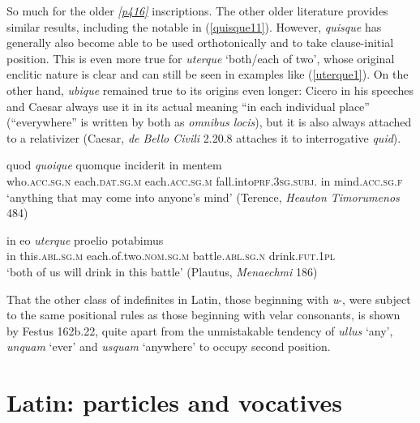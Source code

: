 So much for the older \hyperlink{p416}{\emph{[p416]}} inscriptions. The other older literature provides similar results, including the notable  in (\ref{quisque11}). However, \emph{quisque} has generally also become able to be used orthotonically and to take clause-initial position. This is even more true for \emph{uterque} `both/each of two', whose original enclitic nature is clear and can still be seen in examples like (\ref{uterque1}). On the other hand, \emph{ubique} remained true to its origins even longer: Cicero in his speeches and Caesar always use it in its actual meaning ``in each individual place'' (``everywhere'' is written by both as \emph{omnibus locis}), but it is also always attached to a relativizer (Caesar, \textit{de Bello Civili} 2.20.8 attaches it to interrogative \emph{quid}).

\begin{exe}
\ex
\gll quod \emph{quoique} quomque inciderit in mentem\\
who.\textsc{acc.sg.n} each.\textsc{dat.sg.m} each.\textsc{acc.sg.m} fall.into\textsc{prf.3sg.subj.} in mind.\textsc{acc.sg.f}\\
\trans `anything that may come into anyone's mind' (Terence, \textit{Heauton Timorumenos} 484) 
\label{quisque11}
\end{exe}

\begin{exe}
\ex
\gll in eo \emph{uterque} proelio potabimus\\
in this.\textsc{abl.sg.m} each.of.two.\textsc{nom.sg.m} battle.\textsc{abl.sg.n} drink.\textsc{fut.1pl}\\
\trans `both of us will drink in this battle' (Plautus, \textit{Menaechmi} 186) 
\label{uterque1}
\end{exe}

That the other class of indefinites in Latin, those beginning with \emph{u}-, were subject to the same positional rules as those beginning with velar consonants, is shown by Festus 162b.22, quite apart from the unmistakable tendency of \emph{ullus} `any', \emph{unquam} `ever' and \emph{usquam} `anywhere' to occupy second position.


\section{Latin: particles and vocatives}

